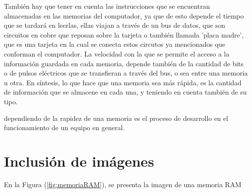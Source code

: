 \documentclass{article}
\begin{document}
También hay que tener en cuenta las instrucciones que se encuentran almacenadas en las memorias del computador, ya que de esto depende el tiempo que se tardará en leerlas, ellas viajan a través de un bus de datos, que son circuitos en cobre que reposan sobre la tarjeta o también llamada 'placa madre', que es una tarjeta en la cual se conecta estos circutos ya mencionados que conforman el computador.
La velocidad con la que se permite el acceso a la información guardada en cada memoria, depende también de la cantidad de bits o de pulsos eléctricos que se transfieran a través del bus, o sea entre una memoria u otra.
En síntesis, lo que hace que una memoria sea más rápida, es la cantidad de información que se almacene en cada una, y teniendo en cuenta también de su tipo. 

dependiendo de la rapidez de una memoria es el proceso de desarrollo en el funcionamiento de un equipo en general.


\section{Inclusión de imágenes} \label{imagenes}

En la Figura (\ref{fig:memoriaRAM}), se presenta la imagen de una memoria RAM



\end{document}
